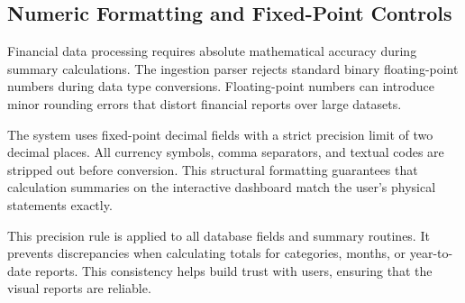 \subsection{Numeric Formatting and Fixed-Point Controls}
Financial data processing requires absolute mathematical accuracy during summary calculations. The ingestion parser rejects standard binary floating-point numbers during data type conversions. Floating-point numbers can introduce minor rounding errors that distort financial reports over large datasets.

The system uses fixed-point decimal fields with a strict precision limit of two decimal places. All currency symbols, comma separators, and textual codes are stripped out before conversion. This structural formatting guarantees that calculation summaries on the interactive dashboard match the user's physical statements exactly.

This precision rule is applied to all database fields and summary routines. It prevents discrepancies when calculating totals for categories, months, or year-to-date reports. This consistency helps build trust with users, ensuring that the visual reports are reliable.
